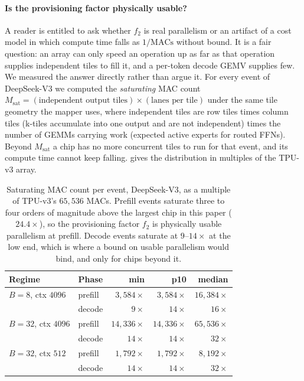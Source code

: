\paragraph{Is the provisioning factor physically usable?}
A reader is entitled to ask whether $f_2$ is real parallelism or an artifact of a cost model in which compute time falls as $1/\mathrm{MACs}$ without bound.
It is a fair question: an array can only speed an operation up as far as that operation supplies independent tiles to fill it, and a per-token decode GEMV supplies few.
We measured the answer directly rather than argue it.
For every event of DeepSeek-V3 we computed the \emph{saturating} MAC count $M_{\mathrm{sat}} = (\text{independent output tiles}) \times (\text{lanes per tile})$ under the same tile geometry the mapper uses, where independent tiles are row tiles times column tiles (k-tiles accumulate into one output and are not independent) times the number of GEMMs carrying work (expected active experts for routed FFNs).
Beyond $M_{\mathrm{sat}}$ a chip has no more concurrent tiles to run for that event, and its compute time cannot keep falling.
 gives the distribution in multiples of the TPU-v3 array.

\begin{table}[ht!]
\centering
\small
\caption{Saturating MAC count per event, DeepSeek-V3, as a multiple of
TPU-v3's $65{,}536$ MACs.
Prefill events saturate three to four orders of
magnitude above the largest chip in this paper ($24.4\times$), so the
provisioning factor $f_2$ is physically usable parallelism at prefill.
Decode
events saturate at $9$--$14\times$ at the low end, which is where a bound on
usable parallelism would bind, and only for chips beyond it.}
\label{tab:msat}
\begin{tabular}{@{}llrrr@{}}
\toprule
Regime & Phase & min & p10 & median \\
\midrule
$B{=}8$, ctx $4096$   & prefill & $3{,}584\times$  & $3{,}584\times$  & $16{,}384\times$ \\
                      & decode  & $9\times$        & $14\times$       & $16\times$ \\
$B{=}32$, ctx $4096$  & prefill & $14{,}336\times$ & $14{,}336\times$ & $65{,}536\times$ \\
                      & decode  & $14\times$       & $14\times$       & $32\times$ \\
$B{=}32$, ctx $512$   & prefill & $1{,}792\times$  & $1{,}792\times$  & $8{,}192\times$ \\
                      & decode  & $14\times$       & $14\times$       & $32\times$ \\
\bottomrule
\end{tabular}
\end{table}

